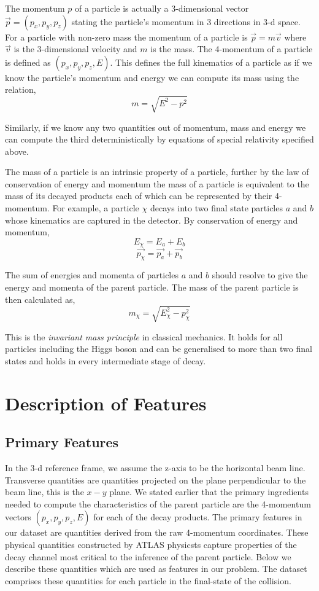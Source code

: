\documentclass[final,3p,times,twocolumn]{elsarticle}
\begin{document}
The momentum $p$ of a particle is actually a 3-dimensional vector $\overrightarrow{p} = (p_{x}, p_{y}, p_{z})$ stating the particle's momentum in 3 directions in 3-d space. For a particle with non-zero mass the momentum of a particle is $\overrightarrow{p} = m\overrightarrow{v}$ where $\overrightarrow{v}$ is the 3-dimensional velocity and $m$ is the mass. The 4-momentum of a particle is defined as $(p_{x}, p_{y}, p_{z}, E)$. This defines the full kinematics of a particle as if we know the particle's momentum and energy we can compute its mass using the relation, $$ m = \sqrt{E^2 - p^2} $$

Similarly, if we know any two quantities out of momentum, mass and energy we can compute the third deterministically by equations of special relativity specified above. 

The mass of a particle is an intrinsic property of a particle, further by the law of conservation of energy and momentum the mass of a particle is equivalent to the mass of its decayed products each of which can be represented by their 4-momentum. For example, a particle $\chi$ decays into two final state particles $a$ and $b$ whose kinematics are captured in the detector. By conservation of energy and momentum, $$E_{\chi} = E_{a} + E_{b}$$ $$\overrightarrow{p_{\chi}} = \overrightarrow{p_{a}} + \overrightarrow{p_{b}}$$

The sum of energies and momenta of particles $a$ and $b$ should resolve to give the energy and momenta of the parent particle. The mass of the parent particle is then calculated as, $$ m_{\chi} = \sqrt{E_{\chi}^2 - p_{\chi}^2} $$ 

This is the \textit{invariant mass principle} in classical mechanics. It holds for all particles including the Higgs boson and can be generalised to more than two final states and holds in every intermediate stage of decay.   


\section{Description of Features}

\subsection{Primary Features}
\label{Pfeatures}

In the 3-d reference frame, we assume the z-axis to be the horizontal beam line. Transverse quantities are quantities projected on the plane perpendicular to the beam line, this is the $x-y$ plane. We stated earlier that the primary ingredients needed to compute the characteristics of the parent particle are the 4-momentum vectors $(p_{x}, p_{y}, p_{z}, E)$ for each of the decay products. The primary features in our dataset are quantities derived from the raw 4-momentum coordinates. These physical quantities constructed by ATLAS physicsts capture properties of the decay channel most critical to the inference of the parent particle. Below we describe these quantities which are used as features in our problem. The dataset comprises these quantities for each particle in the final-state of the collision. \cite{RM}
\end{document}
